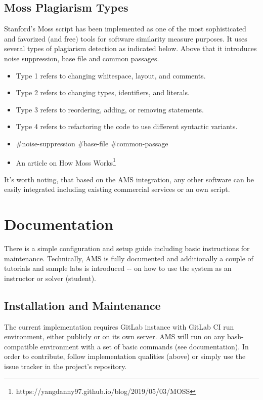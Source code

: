 \subsection{Moss Plagiarism Types}\label{ssec:mossplagtyp}

{Stanford's Moss script has been implemented as one of the most sophisticated and favorized (and free) tools for software similarity measure purposes\cite{mosspaper}. It uses several types of plagiarism detection as indicated below. Above that it introduces noise suppression, base file and common passages.}

\begin{itemize}
\item
  {Type 1 refers to changing whitespace, layout, and comments.}
\item
  {Type 2 refers to changing types, identifiers, and literals.}
\item
  {Type 3 refers to reordering, adding, or removing statements.}
\item
  {Type 4 refers to refactoring the code to use different syntactic variants.}
\item
  {\#noise-suppression \#base-file \#common-passage}
\item
  {An article on How Moss Works\footnote{https://yangdanny97.github.io/blog/2019/05/03/MOSS}}
\end{itemize}

{It's worth noting, that based on the AMS integration, any other software can be easily integrated including existing commercial services or an own script.}

\section{Documentation}\label{sec:doc}

{There is a simple configuration and setup guide including basic instructions for maintenance. Technically, AMS is fully documented and additionally a couple of tutorials and sample labs is introduced -\/- on how to use the system as an instructor or solver (student).}

\subsection{Installation and Maintenance}\label{ssec:installandmaint}

{The current implementation requires GitLab instance with GitLab CI run environment, either publicly or on its own server. AMS will run on any bash-compatible environment with a set of basic commands (see documentation). In order to contribute, follow implementation qualities (above) or simply use the issue tracker in the project's repository.}

